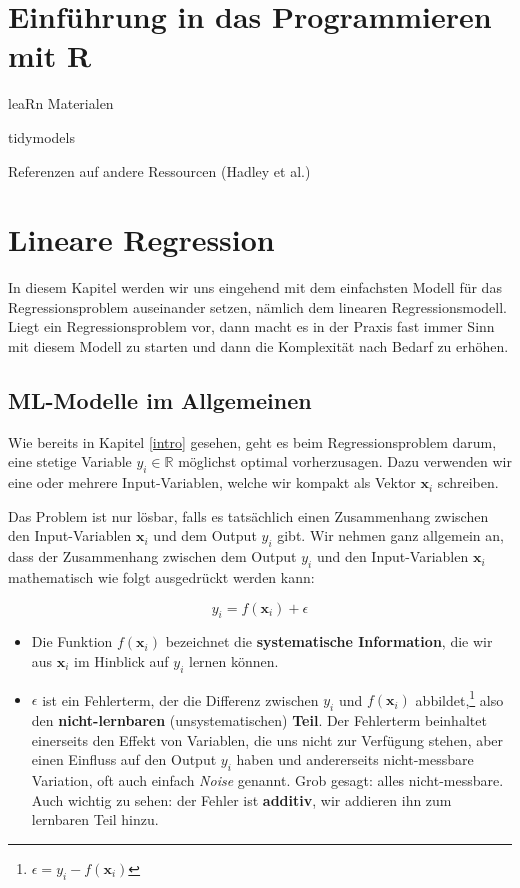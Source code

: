 \documentclass[
]{book}
\providecommand{\tightlist}{%
  \setlength{\itemsep}{0pt}\setlength{\parskip}{0pt}}
\begin{document}
\hypertarget{intro-R}{%
\chapter{Einführung in das Programmieren mit R}\label{intro-R}}

leaRn Materialen

tidymodels

Referenzen auf andere Ressourcen (Hadley et al.)

\hypertarget{lin-reg}{%
\chapter{Lineare Regression}\label{lin-reg}}

In diesem Kapitel werden wir uns eingehend mit dem einfachsten Modell für das Regressionsproblem auseinander setzen, nämlich dem linearen Regressionsmodell. Liegt ein Regressionsproblem vor, dann macht es in der Praxis fast immer Sinn mit diesem Modell zu starten und dann die Komplexität nach Bedarf zu erhöhen.

\hypertarget{ml-modelle-im-allgemeinen}{%
\section{ML-Modelle im Allgemeinen}\label{ml-modelle-im-allgemeinen}}

Wie bereits in Kapitel \ref{intro} gesehen, geht es beim Regressionsproblem darum, eine stetige Variable \(y_i \in \mathbb{R}\) möglichst optimal vorherzusagen. Dazu verwenden wir eine oder mehrere Input-Variablen, welche wir kompakt als Vektor \(\mathbf{x}_i\) schreiben.

Das Problem ist nur lösbar, falls es tatsächlich einen Zusammenhang zwischen den Input-Variablen \(\mathbf{x}_i\) und dem Output \(y_i\) gibt. Wir nehmen ganz allgemein an, dass der Zusammenhang zwischen dem Output \(y_i\) und den Input-Variablen \(\mathbf{x}_i\) mathematisch wie folgt ausgedrückt werden kann:

\[
y_i = f(\mathbf{x}_i) + \epsilon
\]

\begin{itemize}
\tightlist
\item
  Die Funktion \(f(\mathbf{x}_i)\) bezeichnet die \textbf{systematische Information}, die wir aus \(\mathbf{x}_i\) im Hinblick auf \(y_i\) lernen können.
\item
  \(\epsilon\) ist ein Fehlerterm, der die Differenz zwischen \(y_i\) und \(f(\mathbf{x}_i)\) abbildet,\footnote{\(\epsilon = y_i - f(\mathbf{x}_i)\)} also den \textbf{nicht-lernbaren} (unsystematischen) \textbf{Teil}. Der Fehlerterm beinhaltet einerseits den Effekt von Variablen, die uns nicht zur Verfügung stehen, aber einen Einfluss auf den Output \(y_i\) haben und andererseits nicht-messbare Variation, oft auch einfach \emph{Noise} genannt. Grob gesagt: alles nicht-messbare. Auch wichtig zu sehen: der Fehler ist \textbf{additiv}, wir addieren ihn zum lernbaren Teil hinzu.
\end{itemize}
\end{document}
